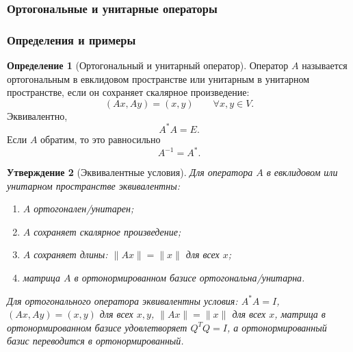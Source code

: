 \documentclass[12pt,a4paper]{article}
\theoremstyle{definition}
\newtheorem{definition}{Определение}[section]
\theoremstyle{plain}
\newtheorem{proposition}[definition]{Утверждение}
\theoremstyle{remark}
\newenvironment{knowledgefix}{\begin{clarifybox}}{\end{clarifybox}}
\begin{document}
\subsubsection{Ортогональные и унитарные операторы}

\subsubsection*{Определения и примеры}

\begin{definition}[Ортогональный и унитарный оператор]
Оператор $A$ называется ортогональным в евклидовом пространстве или унитарным в унитарном пространстве, если он сохраняет скалярное произведение:
\[
    (Ax,Ay)=(x,y)
    \qquad \forall x,y\in V.
\]
Эквивалентно,
\[
    A^*A=E.
\]
Если $A$ обратим, то это равносильно
\[
    A^{-1}=A^*.
\]
\end{definition}

\begin{proposition}[Эквивалентные условия]
Для оператора $A$ в евклидовом или унитарном пространстве эквивалентны:
\begin{enumerate}[label=\arabic*)]
    \item $A$ ортогонален/унитарен;
    \item $A$ сохраняет скалярное произведение;
    \item $A$ сохраняет длины: $\|Ax\|=\|x\|$ для всех $x$;
    \item матрица $A$ в ортонормированном базисе ортогональна/унитарна.
\end{enumerate}
\begin{knowledgefix}
Для ортогонального оператора эквивалентны условия: \(A^*A=I\), \((Ax,Ay)=(x,y)\) для всех \(x,y\), \(\|Ax\|=\|x\|\) для всех \(x\), матрица в ортонормированном базисе удовлетворяет \(Q^TQ=I\), а ортонормированный базис переводится в ортонормированный.
\end{knowledgefix}
\end{proposition}
\end{document}
